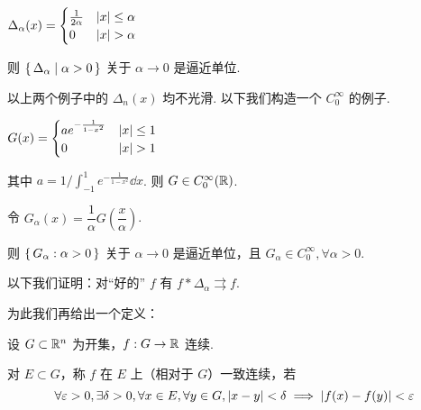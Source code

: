 \begin{example}
    $\Delta_\alpha(x)=\begin{cases}
        \frac{1}{2\alpha} & \left\lvert{x}\right\rvert\le\alpha\\
        0 & \left\lvert{x}\right\rvert>\alpha
    \end{cases}$

    则 $\set{\Delta_\alpha|\alpha>0}$ 关于 $\alpha\to 0$ 是逼近单位.
\end{example}

\begin{hint}
    以上两个例子中的 $\Delta_n(x)$ 均不光滑. 以下我们构造一个 $C_0^\infty$ 的例子.
\end{hint}

\begin{example}\label{appfac}
    $G(x)=\begin{cases}
        ae^{-\frac{1}{1-x^2}} & \left\lvert{x}\right\rvert\le 1\\
        0 & \left\lvert{x}\right\rvert>1
    \end{cases}$

    其中 $a=1\Big/\displaystyle\int_{-1}^1e^{-\frac{1}{1-x^2}}\dd x$. 则 $G\in C_0^\infty(\mathbb{R})$.

    \begin{center}
    \end{center}

    令 $G_\alpha(x)=\dfrac{1}{\alpha}G\left(\dfrac{x}{\alpha}\right)$.

    则 $\set{G_\alpha:\alpha>0}$ 关于 $\alpha\to 0$ 是逼近单位，且 $G_\alpha\in C_0^\infty,\forall\alpha>0$.
\end{example}

以下我们证明：对“好的” $f$ 有 $f*\Delta_\alpha\rightrightarrows f$.

为此我们再给出一个定义：

\begin{definition}
    设 $G\subset\mathbb{R}^n$ 为开集，$f:G\to\mathbb{R}$ 连续.

    对 $E\subset G$，称 $f$ 在 $E$ 上（相对于 $G$）一致连续，若
$$
\forall\varepsilon>0,\exists\delta>0,\forall x\in E,\forall y\in G,\left\lvert{x-y}\right\rvert<\delta\implies\left\lvert{f(x)-f(y)}\right\rvert<\varepsilon
$$
\end{definition}


